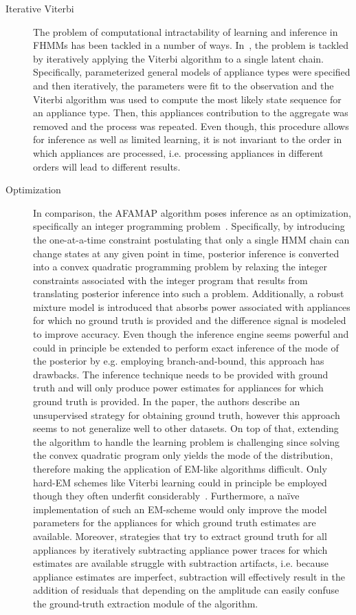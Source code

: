 \documentclass[11pt]{cmuthesis} %
\begin{document}
\begin{description}
\item[Iterative Viterbi] The problem of computational intractability of learning and inference in FHMMs has been tackled in a number of ways. In~\cite{parson2012non}, the problem is tackled by iteratively applying the Viterbi algorithm to a single latent chain. Specifically, parameterized general models of appliance types were specified and then iteratively, the parameters were fit to the observation and the Viterbi algorithm was used to compute the most likely state sequence for an appliance type. Then, this appliances contribution to the aggregate was removed and the process was repeated. Even though, this procedure allows for inference as well as limited learning, it is not invariant to the order in which appliances are processed, i.e. processing appliances in different orders will lead to different results.
\item[Optimization] In comparison, the AFAMAP algorithm poses inference as an optimization, specifically an integer programming problem~\cite{kolter2012approximate,shaloudegi2016sdp}. Specifically, by introducing the one-at-a-time constraint postulating that only a single HMM chain can change states at any given point in time, posterior inference is converted into a convex quadratic programming problem by relaxing the integer constraints associated with the integer program that results from translating posterior inference into such a problem. Additionally, a robust mixture model is introduced that absorbs power associated with appliances for which no ground truth is provided and the difference signal is modeled to improve accuracy. Even though the inference engine seems powerful and could in principle be extended to perform exact inference of the mode of the posterior by e.g. employing branch-and-bound, this approach has drawbacks. The inference technique needs to be provided with ground truth and will only produce power estimates for appliances for which ground truth is provided. In the paper, the authors describe an unsupervised strategy for obtaining ground truth, however this approach seems to not generalize well to other datasets. On top of that, extending the algorithm to handle the learning problem is challenging since solving the convex quadratic program only yields the mode of the distribution, therefore making the application of EM-like algorithms difficult. Only hard-EM schemes like Viterbi learning could in principle be employed though they often underfit considerably~\cite{gutmann2008parameter}. Furthermore, a na\"ive implementation of such an EM-scheme would only improve the model parameters for the appliances for which ground truth estimates are available. Moreover, strategies that try to extract ground truth for all appliances by iteratively subtracting appliance power traces for which estimates are available struggle with subtraction artifacts, i.e. because appliance estimates are imperfect, subtraction will effectively result in the addition of residuals that depending on the amplitude can easily confuse the ground-truth extraction module of the algorithm.

\end{description}
\end{document}
